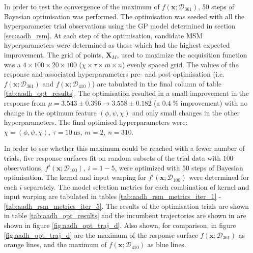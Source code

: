 
In order to test the convergence of the maximum of $f\left(\mathbf{x}; \mathcal{D}_{361}\right)$, \num{50} steps of Bayesian optimisation was performed. The optimisation was seeded with all the hyperparameter trial observations using the GP model determined in section \ref{sec:aadh_rsm}. At each step of the optimisation, candidate MSM hyperparameters were determined as those which had the highest expected improvement. The grid of points, $\mathbf{X}_{M}$, used to maximize the acquisition function was a $4 \times 100 \times 20 \times 100$ ($\chi \times \tau \times m \times n$) evenly spaced grid. The values of the response and associated hyperparameters pre- and post-optimisation (i.e. $f\left(\mathbf{x}; \mathcal{D}_{361}\right)$ and $f\left(\mathbf{x}; \mathcal{D}_{410}\right)$) are tabulated in the final column of table \ref{tab:aadh_opt_results}. The optimisation resulted in a small improvement in the response from $\mu=3.543 \pm 0.396 \rightarrow 3.558 \pm 0.182$ (a $\SI{0.4}{\percent}$ improvement) with no change in the optimum feature $(\phi, \psi, \chi)$ and only small changes in the other hyperparameters. The final optimised hyperparameters were: $\chi=(\phi, \psi, \chi),\ \tau=\SI{10}{\nano\second},\ m=2,\ n=310$. 

In order to see whether this maximum could be reached with a fewer number of trials, five response surfaces fit on random subsets of the trial data with $100$ observations, $f^{i}\left(\mathbf{x};\mathcal{D}_{100}\right),\ i = 1 - 5$, were optimized with \num{50} steps of Bayesian optimisation. The kernel and input warping for $f^{i}\left(\mathbf{x};\mathcal{D}_{100}\right)$ were determined for each $i$ separately. The model selection metrics for each combination of kernel and input warping are tabulated in tables \ref{tab:aadh_rsm_metrics_iter_1} - \ref{tab:aadh_rsm_metrics_iter_5}. The results of the optimisation trials are shown in table \ref{tab:aadh_opt_results} and the incumbent trajectories are shown in are shown in figure \ref{fig:aadh_opt_traj_d}. Also shown, for comparison, in figure \ref{fig:aadh_opt_traj_d} are the maximum of the response surface $f\left(\mathbf{x};\mathcal{D}_{361}\right)$ as orange lines, and the maximum of $f\left(\mathbf{x};\mathcal{D}_{410}\right)$ as blue lines. 

